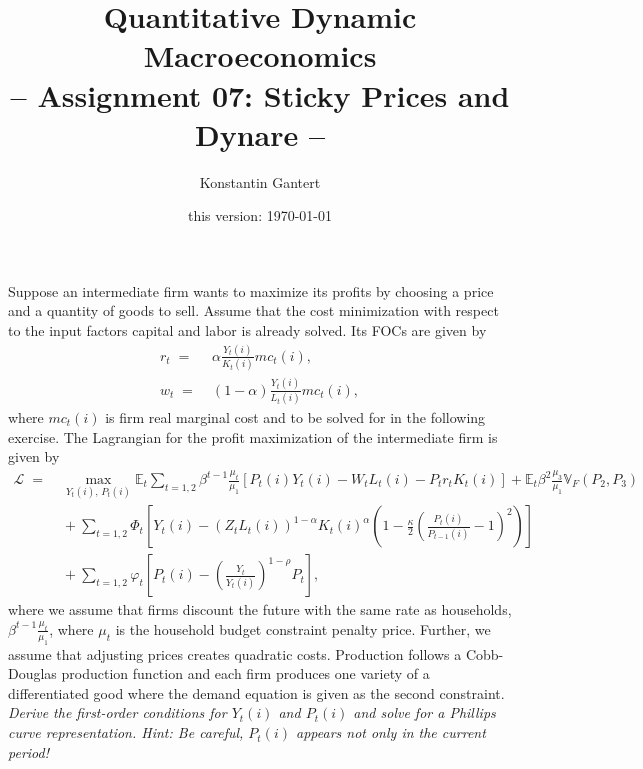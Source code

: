 \documentclass[a4paper, 12pt]{article}
\title{Quantitative Dynamic Macroeconomics \vspace{0.1in} \\ \large{-- Assignment 07: Sticky Prices and Dynare --}}
\author{\small{Konstantin Gantert}}
\date{\small{this version: \today}}
\begin{document}
%
\clearpage\maketitle%

\begin{Exercise}[title={Derive the sticky prices FOC},label=ex_1]%
	Suppose an intermediate firm wants to maximize its profits by choosing a price and a quantity of goods to sell. Assume that the cost minimization with respect to the input factors capital and labor is already solved. Its FOCs are given by%
	\begin{align}%
		r_t \; = & \; \alpha \frac{Y_t(i)}{K_t(i)} mc_t(i),\\%
		w_t \; = & \; \left(1-\alpha\right) \frac{Y_t(i)}{L_t(i)} mc_t(i),%
	\end{align}%
	where $mc_t(i)$ is firm real marginal cost and to be solved for in the following exercise. The Lagrangian for the profit maximization of the intermediate firm is given by%
	\begin{align*}%
		\mathcal{L} \; = & \; \max_{Y_t(i), \, P_t(i)} \mathbb{E}_t \sum_{t=1,2} \beta^{t-1} \frac{\mu_t}{\mu_1} \left[ P_t(i) Y_t(i) - W_t L_t(i) - P_t r_t K_t(i) \right] + \mathbb{E}_t \beta^2 \frac{\mu_3}{\mu_1} \mathbb{V}_F\left(P_2,P_3\right)\\%
		& \; + \sum_{t=1,2} \Phi_t \left[ Y_t(i) - \left(Z_t L_t(i)\right)^{1-\alpha} K_t(i)^\alpha \left(1-\frac{\kappa}{2}\left(\frac{P_t(i)}{P_{t-1}(i)}-1\right)^2\right) \right]\\%
		& \; + \sum_{t=1,2} \varphi_t \left[ P_t(i) - \left(\frac{Y_t}{Y_t(i)}\right)^{1-\rho} P_t \right],%
	\end{align*}%
	where we assume that firms discount the future with the same rate as households, $\beta^{t-1} \frac{\mu_t}{\mu_1}$, where $\mu_t$ is the household budget constraint penalty price. Further, we assume that adjusting prices creates quadratic costs. Production follows a Cobb-Douglas production function and each firm produces one variety of a differentiated good where the demand equation is given as the second constraint.%
	\medskip\\%
	\emph{Derive the first-order conditions for $Y_t(i)$ and $P_t(i)$ and solve for a Phillips curve representation. Hint: Be careful, $P_t(i)$ appears not only in the current period!}%
\end{Exercise}%
\end{document}
